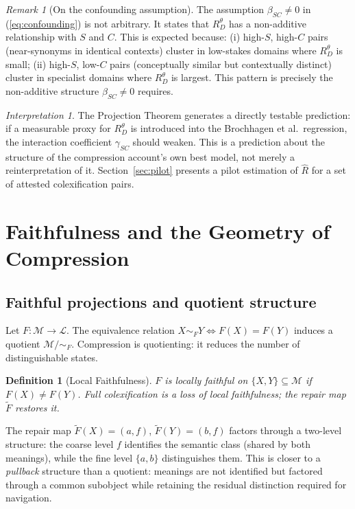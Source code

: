 \documentclass[12pt]{article}
\theoremstyle{rthm}
\theoremstyle{rdef}
\newtheorem{definition}[theorem]{Definition}
\theoremstyle{remark}
\newtheorem*{remark}{Remark}
\newtheorem*{interpretation}{Interpretation}
\newcommand{\M}{\mathcal{M}}
\newcommand{\Lc}{\mathcal{L}}
\newcommand{\RD}[1][\theta]{R_{D}^{#1}}
\newcommand{\Ftil}{\widetilde{F}}
\begin{document}
\begin{remark}[On the confounding assumption]
The assumption $\beta_{SC} \neq 0$ in (\ref{eq:confounding}) is not arbitrary.
It states that $\RD$ has a non-additive relationship with $S$ and $C$. This is
expected because: (i) high-$S$, high-$C$ pairs (near-synonyms in identical
contexts) cluster in low-stakes domains where $\RD$ is small; (ii) high-$S$,
low-$C$ pairs (conceptually similar but contextually distinct) cluster in
specialist domains where $\RD$ is largest. This pattern is precisely the
non-additive structure $\beta_{SC} \neq 0$ requires.
\end{remark}

\begin{interpretation}
The Projection Theorem generates a directly testable prediction: if a measurable
proxy for $\RD$ is introduced into the Brochhagen et al.\ regression, the
interaction coefficient $\gamma_{SC}$ should weaken. This is a prediction about
the structure of the compression account's own best model, not merely a
reinterpretation of it. Section~\ref{sec:pilot} presents a pilot estimation
of $\widehat{R}$ for a set of attested colexification pairs.
\end{interpretation}

\section{Faithfulness and the Geometry of Compression}
\label{sec:geometry}

\subsection{Faithful projections and quotient structure}

Let $F : \M \to \Lc$. The equivalence relation $X \sim_F Y \iff F(X) = F(Y)$
induces a quotient $\M / {\sim_F}$. Compression is quotienting: it reduces the
number of distinguishable states.

\begin{definition}[Local Faithfulness]
$F$ is \emph{locally faithful on $\{X,Y\} \subseteq \M$} if
$F(X) \neq F(Y)$. Full colexification is a loss of local faithfulness; the
repair map $\Ftil$ restores it.
\end{definition}

The repair map $\Ftil(X) = (a,f)$, $\Ftil(Y) = (b,f)$ factors through a
two-level structure: the coarse level $f$ identifies the semantic class (shared
by both meanings), while the fine level $\{a, b\}$ distinguishes them. This is
closer to a \emph{pullback} structure than a quotient: meanings are not
identified but factored through a common subobject while retaining the residual
distinction required for navigation.
\end{document}
